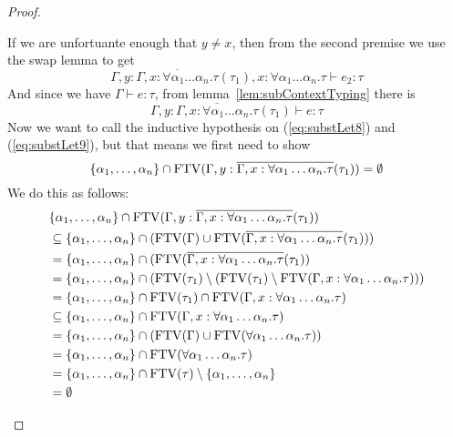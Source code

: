 \begin{proof}
\begin{description}
  If we are unfortuante enough that $y \ne x$, then from the second
  premise we use the swap lemma to get
  \begin{equation} \label{eq:substLet8}
    \Gamma , y : \overline{\Gamma, x : \forall\alpha_1\ldots\alpha_n . \tau}(\tau_1), x : \forall \alpha_1\ldots\alpha_n . \tau  \vdash
    e_2 : \tau
  \end{equation}
  And since we have $\Gamma \vdash e : \tau$, from lemma~\ref{lem:subContextTyping}
  there is
  \begin{equation} \label{eq:substLet9}
  \Gamma , y : \overline{\Gamma , x :\forall\alpha_1\ldots\alpha_n . \tau}(\tau_1) \vdash e : \tau    
  \end{equation}
  Now we want to call the inductive hypothesis on (\ref{eq:substLet8})
  and (\ref{eq:substLet9}), but that means we first need to show
  \[\{ \alpha_1,\ldots,\alpha_n\} \cap \operatorname{FTV}(\Gamma , y : \overline{\Gamma, x : \forall\alpha_1\ldots\alpha_n . \tau}(\tau_1))
    = \emptyset\]
  We do this as follows:
  \begin{align*}
    & \{ \alpha_1,\ldots,\alpha_n\} \cap \operatorname{FTV}(\Gamma , y : \overline{\Gamma, x : \forall\alpha_1\ldots\alpha_n . \tau}(\tau_1)) \\
    &\subseteq \{ \alpha_1,\ldots,\alpha_n\} \cap (\operatorname{FTV}(\Gamma) \cup \operatorname{FTV}(\overline{\Gamma, x : \forall\alpha_1\ldots\alpha_n
      . \tau}(\tau_1))) \\
    &= \{ \alpha_1,\ldots,\alpha_n\} \cap (\operatorname{FTV}(\overline{\Gamma, x : \forall\alpha_1\ldots\alpha_n . \tau}(\tau_1))
    \\
    &= \{ \alpha_1,\ldots,\alpha_n\} \cap (\operatorname{FTV}(\tau_1) \setminus (\operatorname{FTV}(\tau_1) \setminus \operatorname{FTV}(\Gamma,x:\forall
      \alpha_1\ldots\alpha_n.\tau))) \\
    &= \{ \alpha_1,\ldots,\alpha_n\} \cap \operatorname{FTV}(\tau_1) \cap \operatorname{FTV}(\Gamma, x : \forall \alpha_1\ldots\alpha_n . \tau) \\
    &\subseteq \{ \alpha_1,\ldots,\alpha_n\} \cap \operatorname{FTV}(\Gamma, x : \forall \alpha_1\ldots\alpha_n . \tau) \\
    &= \{ \alpha_1,\ldots,\alpha_n\} \cap (\operatorname{FTV}(\Gamma) \cup \operatorname{FTV}(\forall \alpha_1\ldots\alpha_n . \tau)) \\
    &= \{ \alpha_1,\ldots,\alpha_n\} \cap \operatorname{FTV}(\forall \alpha_1\ldots\alpha_n . \tau) \\
    &= \{ \alpha_1,\ldots,\alpha_n\} \cap \operatorname{FTV}(\tau) \setminus \{\alpha_1,\ldots,\alpha_n\} \\
    &= \emptyset
  \end{align*}

\end{description}
\end{proof}
